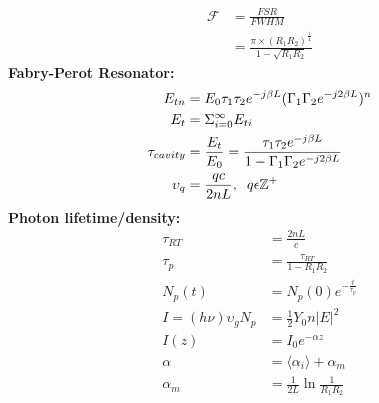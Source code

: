 \documentclass[landscape,a4paper]{article}
\begin{document}
\begin{multicols}{3}
\begin{align}
		\mathscr{F} &= \frac{FSR}{FWHM}\\
		&= \frac{\pi\times (R_1 R_2)^\frac{1}{4}}{1 - \sqrt{R_1 R_2}}
	\end{align}
	\hspace{3mm}\textbf{Fabry-Perot Resonator:}
	\begin{align}
		E_{tn} &= E_0 \tau_1 \tau_2 e^{-j\beta L} (\Gamma_1 \Gamma_2 e^{-j 2 \beta L})^n\\
		E_t &= \Sigma_{i=0}^\infty E_{ti}\\
		\tau_{cavity} &= \frac{E_t}{E_0} = \frac{\tau_1 \tau_2 e^{-j \beta L}}{1 - \Gamma_1 \Gamma_2 e^{-j2 \beta L}}\\
		\upsilon_q &= \frac{qc}{2nL},\hspace{2mm} q \epsilon \mathbb{Z^+}
	\end{align}
	\hspace{3mm}\textbf{Photon lifetime/density:}
	\begin{align}
		\tau_{RT} &= \frac{2nL}{c}\\
		\tau_p &= \frac{\tau_{RT}}{1 - R_1 R_2}\\
		N_p (t) &= N_p (0) e^{-\frac{t}{\tau_p}}\\
		I = (h\nu)\upsilon_g N_p &= \frac{1}{2} Y_0 n |E|^2\\
		I(z) &= I_0 e^{-\alpha z}\\
		\alpha &=  \langle\alpha_i\rangle + \alpha_m\\
		\alpha_m &= \frac{1}{2L} \ln \frac{1}{R_1 R_2}
	\end{align}
\end{multicols}
\end{document}
